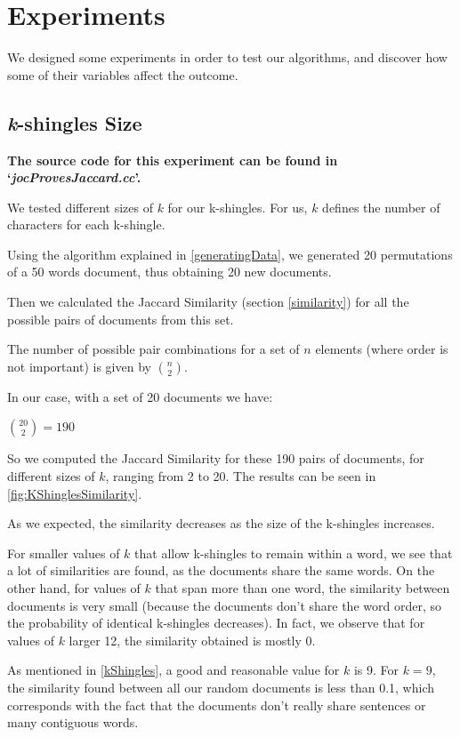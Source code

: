 \documentclass[12pt]{article}
\begin{document}
{\section{Experiments}
We designed some experiments in order to test our algorithms, and discover how some of their variables affect the outcome.

\subsection{\textit{k}-shingles Size}
\textbf{The source code for this experiment can be found in `\textit{jocProvesJaccard.cc}'.}
\bigskip

We tested different sizes of $k$ for our k-shingles.
For us, $k$ defines the number of characters for each k-shingle.

Using the algorithm explained in \autoref{generatingData}, we generated 20 permutations of a 50 words document, thus obtaining 20 new documents.

Then we calculated the Jaccard Similarity (section \autoref{similarity}) for all the possible pairs of documents from this set.

The number of possible pair combinations for a set of $n$ elements (where order is not important) is given by $\binom{n}{2}$.

In our case, with a set of 20 documents we have:
\bigbreak
\centerline{\large $\binom{20}{2} = 190$}
\bigbreak

So we computed the Jaccard Similarity for these 190 pairs of documents, for different sizes of $k$, ranging from 2 to 20. The results can be seen in \autoref{fig:KShinglesSimilarity}.

\bigbreak
As we expected, the similarity decreases as the size of the k-shingles increases.

For smaller values of $k$ that allow k-shingles to remain within a word, we see that a lot of similarities are found, as the documents share the same words.
On the other hand, for values of $k$ that span more than one word, the similarity between documents is very small (because the documents don't share the word order, so the probability of identical k-shingles decreases).
In fact, we observe that for values of $k$ larger 12, the similarity obtained is mostly 0.

As mentioned in \autoref{kShingles}, a good and reasonable value for $k$ is 9.
For $k = 9$, the similarity found between all our random documents is less than 0.1, which corresponds with the fact that the documents don't really share sentences or many contiguous words.

}
\end{document}
